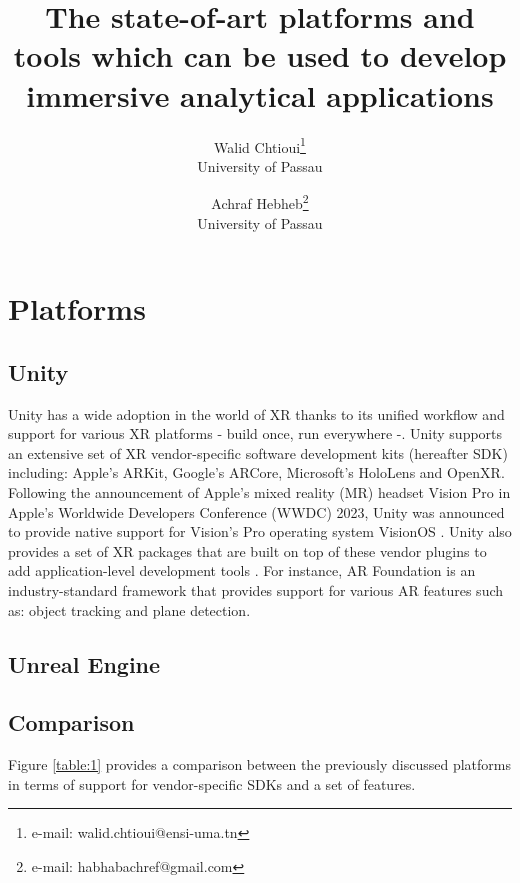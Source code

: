 \documentclass{vgtc}                          %
\title{The state-of-art
platforms and tools which can be used to develop immersive analytical
applications}
\author{Walid Chtioui\thanks{e-mail: walid.chtioui@ensi-uma.tn}\\ %
        \scriptsize University of Passau %
\and Achraf Hebheb\thanks{e-mail: habhabachref@gmail.com}\\ %
     \scriptsize University of Passau}
\begin{document}
\maketitle


\section{Platforms}
\subsection{Unity}
Unity has a wide adoption in the world of XR thanks to its unified workflow
and support for various XR platforms - build once, run
everywhere -. Unity supports an extensive set of XR vendor-specific software
development kits (hereafter SDK) including: Apple's ARKit, Google's ARCore,
Microsoft's HoloLens and OpenXR. Following the announcement of Apple's
mixed reality (MR) headset Vision Pro in Apple's Worldwide Developers
Conference (WWDC) 2023, Unity was announced to provide native support for
Vision's Pro operating system VisionOS \cite{web:vision_pro_unity}.
Unity also provides a set of XR packages that are built on top of these vendor
plugins to add application-level development tools \cite{unity:xr_packages}.
For instance, AR Foundation is an industry-standard framework that provides
support for various AR features such as: object tracking and plane detection.
\subsection{Unreal Engine}
\subsection{Comparison}
Figure \ref{table:1} provides a comparison between the previously discussed
platforms in terms of support for vendor-specific SDKs and a set of features.
\end{document}
